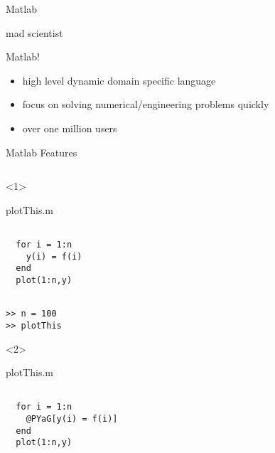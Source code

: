 
\begin{frame}{Matlab}

mad scientist

Matlab!
\begin{itemize}
\item high level dynamic domain specific language
\item focus on solving numerical/engineering problems quickly
\item over one million users
\end{itemize}

\end{frame}
\begin{frame}[fragile]{Matlab Features}
  \begin{columns}
    \begin{column}[T]{5cm}
      \begin{onlyenv}<1>
        \begin{block}{plotThis.m}
          \begin{Verbatim}[commandchars=@\[\]]

  for i = 1:n
    y(i) = f(i)
  end
  plot(1:n,y)
          \end{Verbatim}
        \end{block}
          \begin{Verbatim}[commandchars=@\[\]]

>> n = 100
>> plotThis
        \end{Verbatim}
      \end{onlyenv}
      \begin{onlyenv}<2>
        \begin{block}{plotThis.m}
          \begin{Verbatim}[commandchars=@\[\]]

  for i = 1:n
    @PYaG[y(i) = f(i)]
  end
  plot(1:n,y)
          \end{Verbatim}
        \end{block}
          \begin{Verbatim}[commandchars=@\[\]]


\end{Verbatim}
\end{onlyenv}
\end{column}
\end{columns}
\end{frame}
